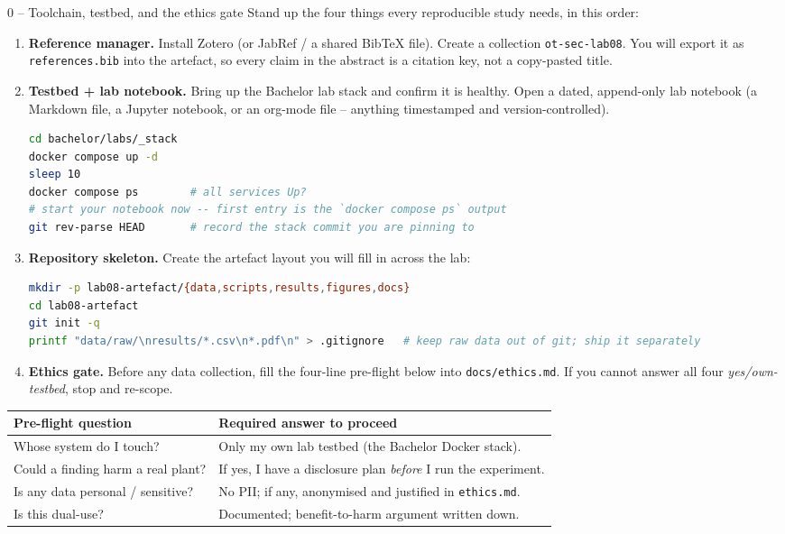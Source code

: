 \documentclass[11pt,a4paper]{article}
\begin{document}
\begin{stepbox}{0 -- Toolchain, testbed, and the ethics gate}
Stand up the four things every reproducible study needs, in this order:
\begin{enumerate}\setlength{\itemsep}{2pt}
  \item \textbf{Reference manager.} Install Zotero (or JabRef / a shared BibTeX file). Create a collection \texttt{ot-sec-lab08}. You will export it as \texttt{references.bib} into the artefact, so every claim in the abstract is a citation key, not a copy-pasted title.
  \item \textbf{Testbed + lab notebook.} Bring up the Bachelor lab stack and confirm it is healthy. Open a dated, append-only lab notebook (a Markdown file, a Jupyter notebook, or an org-mode file -- anything timestamped and version-controlled).
\begin{lstlisting}[language=bash]
cd bachelor/labs/_stack
docker compose up -d
sleep 10
docker compose ps        # all services Up?
# start your notebook now -- first entry is the `docker compose ps` output
git rev-parse HEAD       # record the stack commit you are pinning to
\end{lstlisting}
  \item \textbf{Repository skeleton.} Create the artefact layout you will fill in across the lab:
\begin{lstlisting}[language=bash]
mkdir -p lab08-artefact/{data,scripts,results,figures,docs}
cd lab08-artefact
git init -q
printf "data/raw/\nresults/*.csv\n*.pdf\n" > .gitignore   # keep raw data out of git; ship it separately
\end{lstlisting}
  \item \textbf{Ethics gate.} Before any data collection, fill the four-line pre-flight below into \texttt{docs/ethics.md}. If you cannot answer all four \emph{yes/own-testbed}, stop and re-scope.
\end{enumerate}

\vspace{1mm}
{\footnotesize
\begin{tabular}{@{}p{6.6cm}p{9.0cm}@{}}
\toprule
\textbf{Pre-flight question} & \textbf{Required answer to proceed} \\
\midrule
Whose system do I touch?            & Only my own lab testbed (the Bachelor Docker stack). \\
Could a finding harm a real plant?  & If yes, I have a disclosure plan \emph{before} I run the experiment. \\
Is any data personal / sensitive?   & No PII; if any, anonymised and justified in \texttt{ethics.md}. \\
Is this dual-use?                    & Documented; benefit-to-harm argument written down. \\
\bottomrule
\end{tabular}}
\end{stepbox}
\end{document}
